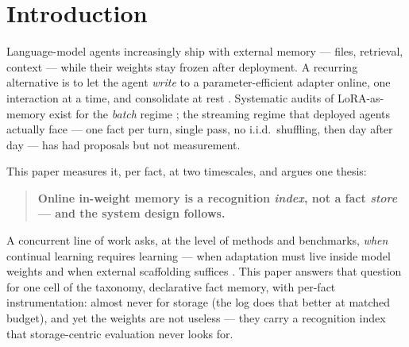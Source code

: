 \documentclass[11pt]{article}
\begin{document}
\begin{abstract}
judge) ---
with the honest attribution that most of the climb is instrument (genre-matched
first-person queries; short precise contexts; an annealing effect where writes that
\emph{follow} the fact unlock the readout), the write's cashable residue is a
consistent-but-underpowered $+0.048$ as a \emph{query sharpener} under per-task isolation
(its keyword-level pointer, by contrast, is priced at zero once an agentic loop may
simply re-query) --- while under the realistic write stream the write cashes at
conventional significance: $+0.136$ over the best frozen front end (exact $p{=}0.019$,
post hoc),
with the pipeline's two pre-registered gold-free controls (no writes; chatter-only
writes) collapsing to $0.080$ against the arm's $0.448$ --- and a
certification--retrieval dose wall separates what two write-steps certify from what six can
retrieve --- with the index's key shown to be a property of the write format itself.
Everything is reported as floors and directions with per-seed numbers; the instrument, raw
per-fact timelines, and the self-run refutations of our own stronger readings are all released.
\end{abstract}

\section{Introduction}

Language-model agents increasingly ship with external memory --- files, retrieval, context ---
while their weights stay frozen after deployment. A recurring alternative is to let the agent
\emph{write} to a parameter-efficient adapter online, one interaction at a time, and consolidate
at rest \citep{lee2026offline,behrouz2026sleep,scm2026,behrouz2024titans}. Systematic audits of
LoRA-as-memory exist for the \emph{batch} regime \citep{back2026lora}; the streaming regime that
deployed agents actually face --- one fact per turn, single pass, no i.i.d.\ shuffling, then day
after day --- has had proposals but not measurement.

This paper measures it, per fact, at two timescales, and argues one thesis:

\begin{quote}
\textbf{Online in-weight memory is a recognition \emph{index}, not a fact \emph{store} --- and
the system design follows.}
\end{quote}

A concurrent line of work asks, at the level of methods and benchmarks, \emph{when} continual
learning requires learning --- when adaptation must live inside model weights and when external
scaffolding suffices \citep{harrington2026when}. This paper answers that question for one cell of
the taxonomy, declarative fact memory, with per-fact instrumentation: almost never for storage
(the log does that better at matched budget), and yet the weights are not useless --- they carry a
recognition index that storage-centric evaluation never looks for.
\end{document}
